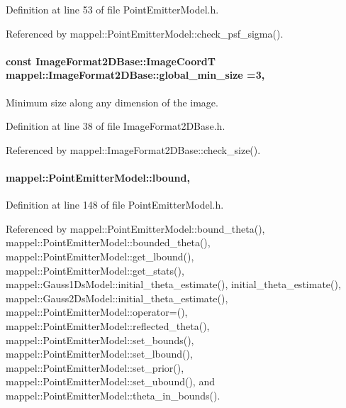 Definition at line 53 of file Point\+Emitter\+Model.\+h.



Referenced by mappel\+::\+Point\+Emitter\+Model\+::check\+\_\+psf\+\_\+sigma().

\paragraph[{\texorpdfstring{global\+\_\+min\+\_\+size}{global_min_size}}]{\setlength{\rightskip}{0pt plus 5cm}const {\bf Image\+Format2\+D\+Base\+::\+Image\+CoordT} mappel\+::\+Image\+Format2\+D\+Base\+::global\+\_\+min\+\_\+size =3\hspace{0.3cm}{\ttfamily [static]}, {\ttfamily [inherited]}}\hypertarget{classmappel_1_1ImageFormat2DBase_a1149e8545d3cfaa40c2f3bc02e3223b2}{}\label{classmappel_1_1ImageFormat2DBase_a1149e8545d3cfaa40c2f3bc02e3223b2}
Minimum size along any dimension of the image. 

Definition at line 38 of file Image\+Format2\+D\+Base.\+h.



Referenced by mappel\+::\+Image\+Format2\+D\+Base\+::check\+\_\+size().

\paragraph[{\texorpdfstring{lbound}{lbound}}]{ mappel\+::\+Point\+Emitter\+Model\+::lbound\hspace{0.3cm}{\ttfamily [protected]}, {\ttfamily [inherited]}}\hypertarget{classmappel_1_1PointEmitterModel_a889bc82f74cfa654da121e5770296ab2}{}\label{classmappel_1_1PointEmitterModel_a889bc82f74cfa654da121e5770296ab2}


Definition at line 148 of file Point\+Emitter\+Model.\+h.



Referenced by mappel\+::\+Point\+Emitter\+Model\+::bound\+\_\+theta(), mappel\+::\+Point\+Emitter\+Model\+::bounded\+\_\+theta(), mappel\+::\+Point\+Emitter\+Model\+::get\+\_\+lbound(), mappel\+::\+Point\+Emitter\+Model\+::get\+\_\+stats(), mappel\+::\+Gauss1\+Ds\+Model\+::initial\+\_\+theta\+\_\+estimate(), initial\+\_\+theta\+\_\+estimate(), mappel\+::\+Gauss2\+Ds\+Model\+::initial\+\_\+theta\+\_\+estimate(), mappel\+::\+Point\+Emitter\+Model\+::operator=(), mappel\+::\+Point\+Emitter\+Model\+::reflected\+\_\+theta(), mappel\+::\+Point\+Emitter\+Model\+::set\+\_\+bounds(), mappel\+::\+Point\+Emitter\+Model\+::set\+\_\+lbound(), mappel\+::\+Point\+Emitter\+Model\+::set\+\_\+prior(), mappel\+::\+Point\+Emitter\+Model\+::set\+\_\+ubound(), and mappel\+::\+Point\+Emitter\+Model\+::theta\+\_\+in\+\_\+bounds().

